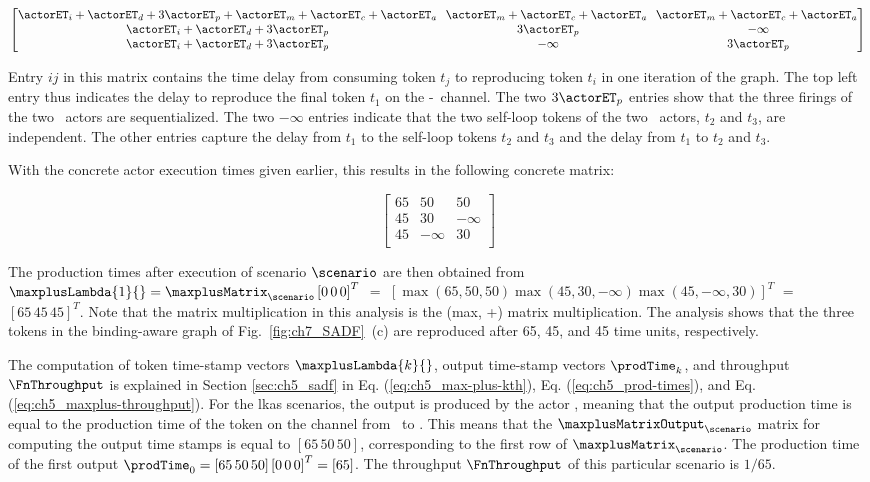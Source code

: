 {\small
$$
    \begin{bmatrix}
    \actorET_i+\actorET_d+3\actorET_p+\actorET_m+\actorET_c+\actorET_a & \hspace*{-1mm}\actorET_m+\actorET_c+\actorET_a & \hspace*{-1mm}\actorET_m+\actorET_c+\actorET_a \\
    \actorET_i+\actorET_d+3\actorET_p & 3\actorET_p & -\infty{} \\
    \actorET_i+\actorET_d+3\actorET_p & -\infty & 3\actorET_p \\
    \end{bmatrix}
$$
}

Entry $ij$ in this matrix contains the time delay from consuming token $t_j$ to reproducing token $t_i$ in one iteration of the graph. The top left entry thus indicates the delay to reproduce the final token $t_1$ on the \taskA-\taskISP\ channel. The two $3\actorET_p$ entries show that the three firings of the two \taskRoIP\ actors are sequentialized. The two $-\infty$ entries indicate that the two self-loop tokens of the two \taskRoIP\ actors, $t_2$ and $t_3$,  are independent. The other entries capture the delay from $t_1$ to the self-loop tokens $t_2$ and $t_3$ and the delay from $t_1$ to $t_2$ and $t_3$.

With the concrete actor execution times given earlier, this results in the following concrete matrix:

{\small
$$
\begin{bmatrix}
    65 & 50 & 50 \\
    45 & 30 & -\infty{} \\
    45 & -\infty & 30 \\
    \end{bmatrix}
$$
}

The production times after execution of scenario $\scenario$ are then obtained from
$\maxplusLambda{1}{}=\maxplusMatrix_{\scenario}\left[ 0\, 0\, 0 \right]^T$ $=$ $\left[\max(65,50,50) \max(45,30,-\infty) \max(45,-\infty,30)\right]^T$ $=$ $\left[ 65\,45\,45 \right]^T$.
Note that the matrix multiplication in this analysis is the (max, +) matrix multiplication. The analysis shows that the three tokens in the binding-aware graph of Fig.~\ref{fig:ch7_SADF}~(c) are reproduced after 65, 45, and 45 time units, respectively.

The computation of token time-stamp vectors $\maxplusLambda{k}{}$, output time-stamp vectors $\prodTime_k$, and throughput $\FnThroughput$ is explained in Section \ref{sec:ch5_sadf} in Eq. (\ref{eq:ch5_max-plus-kth}), Eq. (\ref{eq:ch5_prod-times}), and Eq. (\ref{eq:ch5_maxplus-throughput}).
For the \gls{lkas} scenarios, the output is produced by the actor \taskA, meaning that the output production time is equal to the production time of the token on the channel from \taskA\ to \taskISP. This means that the $\maxplusMatrixOutput_{\scenario}$ matrix for computing the output time stamps is equal to $\left[ 65\,50\,50\right]$, corresponding to the first row of $\maxplusMatrix_{\scenario}$. The production time of the first output $\prodTime_0=\left[ 65\,50\,50\right]\left[ 0\, 0\, 0\right]^T=\left[ 65\right]$. The throughput $\FnThroughput$ of this particular scenario is ${1}/{65}$.

